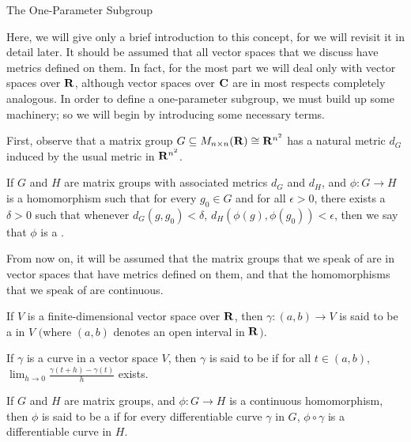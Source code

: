 \begin{section}{The One-Parameter Subgroup}

Here, we will give only a brief introduction to this concept, for we will revisit it in detail later.  It should be assumed that all vector spaces that we discuss have metrics defined on them.  In fact, for the most part we will deal only with vector spaces over $\mathbf{R}$, although vector spaces over $\mathbf{C}$ are in most respects completely analogous.  In order to define a one-parameter subgroup, we must build up some machinery; so we will begin by introducing some necessary terms.

First, observe that a matrix group $G \subseteq M_{n \times n}(\mathbf{R}) \cong \mathbf{R}^{n^2}$ has a natural metric $d_G$ induced by the usual metric in $\mathbf{R}^{n^2}$.

\begin{definition}
\label{cont}
If $G$ and $H$ are matrix groups with associated metrics $d_G$ and $d_H$, and $\phi: G \longrightarrow H$ is a homomorphism such that for every $g_0 \in G$ and for all $\epsilon > 0$, there exists a $\delta > 0$ such that whenever $d_G(g,g_0) < \delta$, $d_H(\phi(g),\phi(g_0)) < \epsilon$, then we say that $\phi$ is a .
\end{definition}

From now on, it will be assumed that the matrix groups that we speak of are in vector spaces that have metrics defined on them, and that the homomorphisms that we speak of are continuous.

\begin{definition}
\label{curve}
If $V$ is a finite-dimensional vector space over $\mathbf{R}$, then $\gamma: (a,b) \longrightarrow V$ is said to be a  in $V$ $($where $(a,b)$ denotes an open interval in $\mathbf{R}$$)$.
\end{definition}

\begin{definition}
\label{differentiable}
If $\gamma$ is a curve in a vector space $V$, then $\gamma$ is said to be  if for all $t \in (a,b)$, $\lim_{h \to 0}\frac{\gamma(t+h) - \gamma(t)}{h}$ exists.
\end{definition}

\begin{definition}
\label{smooth}
If $G$ and $H$ are matrix groups, and $\phi: G \longrightarrow H$ is a continuous homomorphism, then $\phi$ is said to be a  if for every differentiable curve $\gamma$ in $G$, $\phi \circ \gamma$ is a differentiable curve in $H$.
\end{definition}


\end{section}
